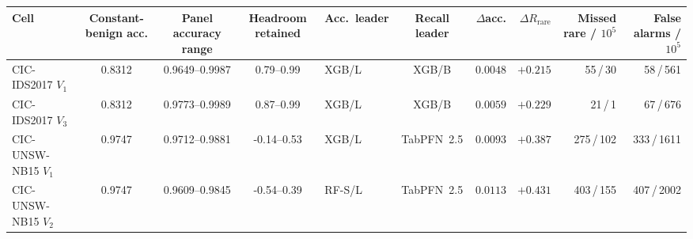 \begin{tabular}{@{}lccclcrrrr@{}}
\toprule
Cell & Constant-benign acc. & Panel accuracy range & Headroom retained & Acc.\ leader & Recall leader & $\Delta$acc. & $\Delta R_{\mathrm{rare}}$ & Missed rare / $10^5$ & False alarms / $10^5$ \\
\midrule
CIC-IDS2017 $V_1$ & 0.8312 & 0.9649--0.9987 & 0.79--0.99 & XGB/L & XGB/B & $0.0048$ & $+0.215$ & 55\,/\,30 & 58\,/\,561 \\
CIC-IDS2017 $V_3$ & 0.8312 & 0.9773--0.9989 & 0.87--0.99 & XGB/L & XGB/B & $0.0059$ & $+0.229$ & 21\,/\,1 & 67\,/\,676 \\
CIC-UNSW-NB15 $V_1$ & 0.9747 & 0.9712--0.9881 & -0.14--0.53 & XGB/L & TabPFN~2.5 & $0.0093$ & $+0.387$ & 275\,/\,102 & 333\,/\,1611 \\
CIC-UNSW-NB15 $V_2$ & 0.9747 & 0.9609--0.9845 & -0.54--0.39 & RF-S/L & TabPFN~2.5 & $0.0113$ & $+0.431$ & 403\,/\,155 & 407\,/\,2002 \\
\bottomrule
\end{tabular}
